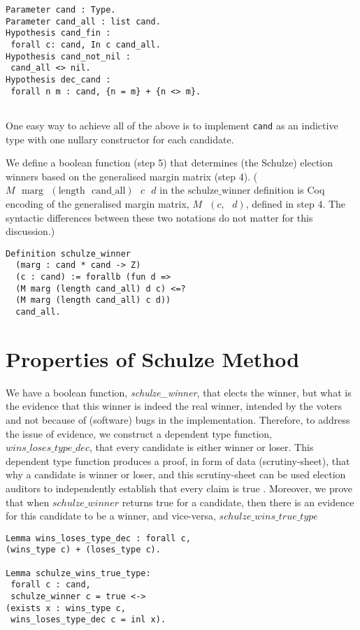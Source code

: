 \documentclass[compsoc,conference,a4paper,10pt,times]{IEEEtran}
\begin{document}
 \begin{verbatim}
Parameter cand : Type.
Parameter cand_all : list cand.
Hypothesis cand_fin : 
 forall c: cand, In c cand_all.
Hypothesis cand_not_nil : 
 cand_all <> nil.
Hypothesis dec_cand : 
 forall n m : cand, {n = m} + {n <> m}.


\end{verbatim}

One easy way to achieve all of the above is to implement
\texttt{cand} as an indictive type with one nullary constructor for
each candidate.


We define a boolean function (step 5) that determines 
(the Schulze) election winners based on 
the generalised margin matrix (step 4). ($M \text{ } \mathrm{marg} \text{ } 
(\mathrm{length} \text{ } \mathrm{cand\_all}) \text{ } c \text{ } d$
in the $\mathrm{schulze\_winner}$ definition is Coq encoding of the 
generalised margin matrix, 
$M \text{ } (c, \text{ }d)$, defined in step 4. The syntactic differences between these 
two notations do not matter  for this discussion.)
 \begin{verbatim}
Definition schulze_winner 
  (marg : cand * cand -> Z) 
  (c : cand) := forallb (fun d => 
  (M marg (length cand_all) d c) <=? 
  (M marg (length cand_all) c d))
  cand_all.
\end{verbatim}


\section{Properties of Schulze Method}
We have a boolean function,  \textit{schulze\_winner},  that 
elects the winner, but what is the evidence that 
this winner is indeed the real winner,  intended by the voters and 
not because of (software) bugs in the implementation. 
Therefore, to address the issue of evidence,  
we construct a dependent type function, $wins\_loses\_type\_dec$, 
that every candidate is either winner or loser. This dependent type 
function produces a proof, in form of 
data (scrutiny-sheet), that why a candidate is winner or loser, and this 
scrutiny-sheet can be used election auditors to independently establish 
that every claim is true \cite{Arkoudas:2005:DRC, Rivest:2008:PTRS}. Moreover,
we prove that when $schulze\_winner$ returns true for a candidate, then
there is an evidence for this candidate to be a winner, and vice-versa, 
$schulze\_wins\_true\_type$

\begin{verbatim}
Lemma wins_loses_type_dec : forall c, 
(wins_type c) + (loses_type c).

Lemma schulze_wins_true_type: 
 forall c : cand, 
 schulze_winner c = true <-> 
(exists x : wins_type c, 
 wins_loses_type_dec c = inl x).
\end{verbatim}
\end{document}
